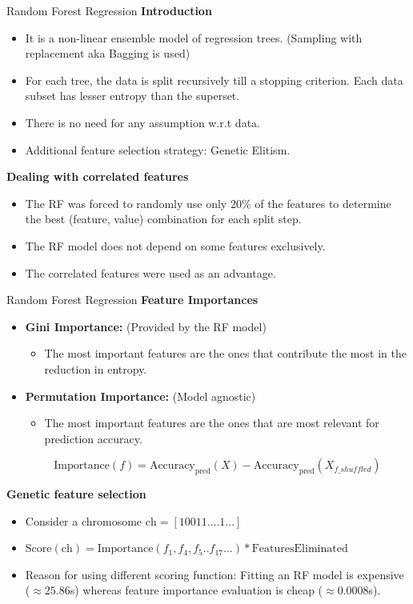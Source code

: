 \documentclass{beamer}
\begin{document}
\begin{frame}[t]{Random Forest Regression}
\textbf{Introduction}
\begin{itemize}
\item It is a non-linear ensemble model of regression trees.  (Sampling with replacement aka Bagging is used)
\item For each tree,  the data is split recursively till a stopping criterion.  Each data subset has lesser entropy than the superset.
\item There is no need for any assumption w.r.t data.
\item Additional feature selection strategy: Genetic Elitism.
\end{itemize}
\textbf{Dealing with correlated features}
\begin{itemize}
\item The RF was forced to randomly use only 20\% of the features to determine the best (feature, value) combination for each split step.
\item The RF model does not depend on some features exclusively.
\item The correlated features were used as an advantage.
\end{itemize}
\end{frame}
 
 \begin{frame}[t]{Random Forest Regression}
\textbf{Feature Importances}
\begin{itemize}
\item \textbf{Gini Importance:} (Provided by the RF model) 
\begin{itemize}
\item The most important features are the ones that contribute the most in the reduction in entropy.
\end{itemize}  
\item \textbf{Permutation Importance:} (Model agnostic)
\begin{itemize}
\item The most important features are the ones that are most relevant for prediction accuracy.
\end{itemize}
$$\mathrm{Importance}(f) = \mathrm{Accuracy_{pred}}(X) - \mathrm{Accuracy_{pred}}(X_{f\_shuffled})$$
\end{itemize}

\textbf{Genetic feature selection}
\begin{itemize}
\item Consider a chromosome $\mathrm{ch} = [10011....1...]$
\item $\mathrm{Score}(\mathrm{ch}) = \mathrm{Importance}(f_1,  f_4, f_5 ..f_{17}... ) * \mathrm{FeaturesEliminated}$
\item Reason for using different scoring function: Fitting an RF model is expensive ($\approx 25.86$s) whereas feature importance evaluation is cheap ($\approx  0.0008$s).
\end{itemize}

\end{frame}
\end{document}
